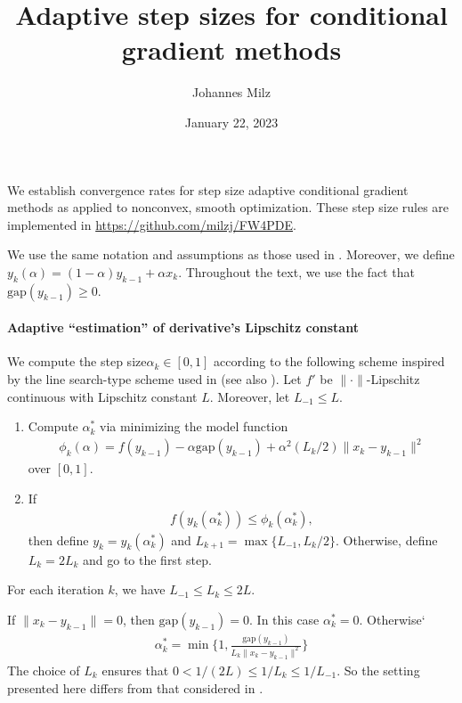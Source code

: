 \documentclass{scrartcl}
\title{Adaptive step sizes for conditional gradient methods}
\author{Johannes Milz}
\date{January 22, 2023}
\begin{document}
	
	\maketitle
	
	We establish convergence rates for step size adaptive conditional
	gradient methods as applied to nonconvex, smooth optimization.
	These step size rules are implemented in 
	\url{https://github.com/milzj/FW4PDE}.
	
	We use the same notation and assumptions 
	as those used in \cite[sect.\ 7.3]{Lan2020}. 
	Moreover, we define $y_k(\alpha) = (1-\alpha)y_{k-1} + \alpha x_k$.
	Throughout the text, we use the fact that $\mathrm{gap}(y_{k-1}) \geq 0$.
	
	\paragraph{Adaptive ``estimation'' of derivative's Lipschitz constant}
	We compute the step size$\alpha_k \in [0,1]$ according to the following
	scheme inspired by the line search-type scheme used in \cite{Nesterov2006}
	(see also \cite{Pedregosa2018,Pedregosa2020}).
	Let $f'$ be $\|\cdot\|$-Lipschitz continuous with Lipschitz
	constant $L$. Moreover, let $L_{-1} \leq L$.
	\begin{enumerate}
		\item 
		Compute $\alpha_k^*$ via minimizing
		the model function
		\begin{align*}
			\phi_k(\alpha) = 
			f(y_{k-1}) - \alpha \mathrm{gap}(y_{k-1})
			+ \alpha^2(L_k/2) \|x_k -y_{k-1}\|^2
		\end{align*}
		over $[0,1]$.
		
		\item If 
		\begin{align*}
			f(y_k(\alpha_k^*)) \leq  \phi_k(\alpha_k^*),
		\end{align*}
		then define $y_k = y_k(\alpha_k^*)$
		and $L_{k+1}  = \max\{L_{-1},L_k/2\}$.
		Otherwise, define $L_{k} = 2L_k$ and go to the first step.
	\end{enumerate}
	For each iteration $k$, we have $L_{-1} \leq L_k \leq 2L$.
	
	If $\|x_k -y_{k-1}\| = 0$, then $\mathrm{gap}(y_{k-1}) = 0$.
	In this case $\alpha_k^*= 0$. Otherwise`
	\begin{align*}
		\alpha_k^* = \min\{1, \frac{\mathrm{gap}(y_{k-1})}{L_k\|x_k -y_{k-1}\|^2}\} 
	\end{align*}
	The choice of $L_k$ ensures that
	$0 < 1/(2L) \leq 1/L_k \leq 1/L_{-1}$.
	So the setting
	presented here differs from that considered in \cite[p.\ 24]{Levitin1966}.
\end{document}
